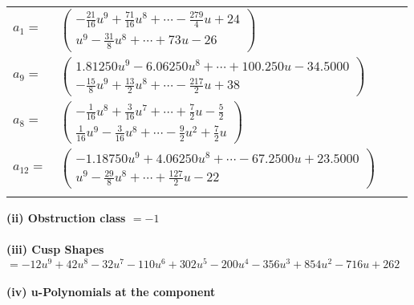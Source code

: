 \documentclass[1p]{elsarticle_modified}
\theoremstyle{definition}
\begin{document}
\begin{tabular}{m{7pt} m{180pt} m{7pt} m{180pt} }
\flushright $a_{1}=$&$\begin{pmatrix}-\frac{21}{16} u^9+\frac{71}{16} u^8+\cdots-\frac{279}{4} u+24\\u^9-\frac{31}{8} u^8+\cdots+73 u-26\end{pmatrix}$ \\
\flushright $a_{9}=$&$\begin{pmatrix}1.81250 u^{9}-6.06250 u^{8}+\cdots+100.250 u-34.5000\\-\frac{15}{8} u^9+\frac{13}{2} u^8+\cdots-\frac{217}{2} u+38\end{pmatrix}$ \\
\flushright $a_{8}=$&$\begin{pmatrix}-\frac{1}{16} u^8+\frac{3}{16} u^7+\cdots+\frac{7}{2} u-\frac{5}{2}\\\frac{1}{16} u^9-\frac{3}{16} u^8+\cdots-\frac{9}{2} u^2+\frac{7}{2} u\end{pmatrix}$ \\
\flushright $a_{12}=$&$\begin{pmatrix}-1.18750 u^{9}+4.06250 u^{8}+\cdots-67.2500 u+23.5000\\u^9-\frac{29}{8} u^8+\cdots+\frac{127}{2} u-22\end{pmatrix}$\\&\end{tabular}
\flushleft \textbf{(ii) Obstruction class $= -1$}\\~\\
\flushleft \textbf{(iii) Cusp Shapes $= -12 u^9+42 u^8-32 u^7-110 u^6+302 u^5-200 u^4-356 u^3+854 u^2-716 u+262$}\\~\\
\newpage\renewcommand{\arraystretch}{1}
\flushleft \textbf{(iv) u-Polynomials at the component}\newline \\
\end{document}
